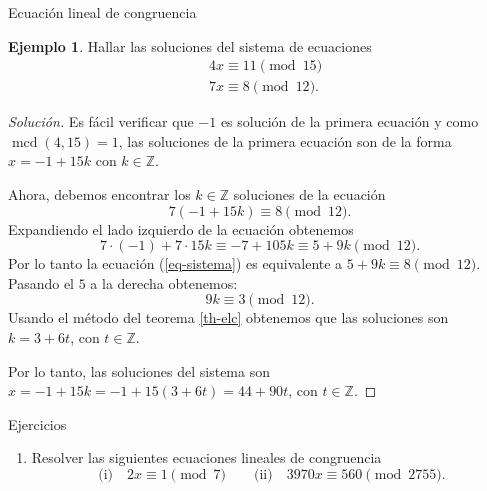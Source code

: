 \documentclass[11pt,spanish,makeidx]{amsbook}
\theoremstyle{definition}
\newtheorem{ejemplo}{Ejemplo}[section]
\theoremstyle{remark}
\newcommand \ZZ{{\mathbb Z}}
\newcommand \mcd{\operatorname{mcd}}
\begin{document}
\begin{section}{Ecuación lineal de congruencia}
\begin{ejemplo} Hallar las soluciones del sistema de ecuaciones
	\begin{align*}
		&4x\equiv 11 \pmod{15} \\
		&7x\equiv 8 \pmod{12}.	
	\end{align*}
\end{ejemplo}
\begin{proof}[Solución] 
	Es fácil verificar que  $-1$ es solución de la primera ecuación y como $\mcd(4,15)=1$, las soluciones  de la primera ecuación son de la forma $x= -1 + 15k$ con $k \in \ZZ$. 
	
	Ahora, debemos encontrar los $k \in \ZZ$ soluciones de la ecuación
	\begin{equation}\label{eq-sistema}
		7(-1 + 15k)\equiv 8 \pmod{12}.
	\end{equation}
	Expandiendo el lado izquierdo de la ecuación obtenemos
	\begin{equation*}
		7\cdot (-1) + 7\cdot 15 k\equiv -7 + 105 k\equiv 5 + 9k \pmod{12}.
	\end{equation*}
	Por lo tanto la ecuación  (\ref{eq-sistema}) es equivalente a $5 + 9k \equiv 8 \pmod{12}$. Pasando el $5$ a la derecha obtenemos:
	\begin{equation}
		9k \equiv 3 \pmod{12}.
	\end{equation}
	Usando el método del teorema \ref{th-elc} obtenemos que las soluciones son  $k = 3 + 6t$, con $t \in \ZZ$. 
	
	Por lo tanto, las soluciones del sistema son $x =  -1 + 15k =  -1 + 15(3 + 6t)= 44 + 90t$, con $t \in \ZZ$. 
\end{proof}


\begin{subsection}{Ejercicios}
\begin{enumerate}
\item  Resolver las siguientes ecuaciones lineales de congruencia
$$ \text{(i)}\quad 2x \equiv 1 \pmod{7}\qquad
 \text{(ii)}\quad 3970x \equiv 560 \pmod{2755}.
$$
\end{enumerate}
\end{subsection}

\end{section}
\end{document}
